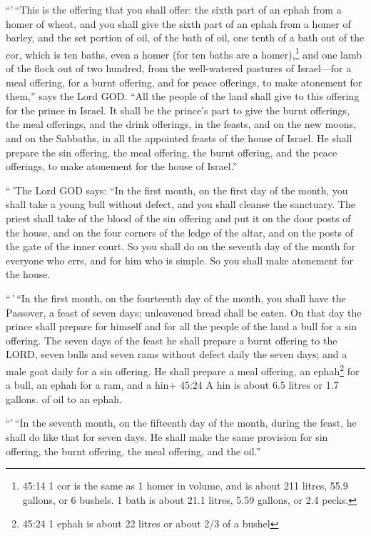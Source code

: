  ``'\,``This is the offering that you shall offer: the
sixth part of an ephah from a homer of wheat, and you shall give the
sixth part of an ephah from a homer of barley,  and the set
portion of oil, of the bath of oil, one tenth of a bath out of the cor,
which is ten baths, even a homer (for ten baths are a homer),\footnote{45:14
  1 cor is the same as 1 homer in volume, and is about 211 litres, 55.9
  gallons, or 6 bushels. 1 bath is about 21.1 litres, 5.59 gallons, or
  2.4 pecks.}  and one lamb of the flock out of two
hundred, from the well-watered pastures of Israel---for a meal offering,
for a burnt offering, and for peace offerings, to make atonement for
them,'' says the Lord GOD.  ``All the people of the land
shall give to this offering for the prince in Israel.  It
shall be the prince's part to give the burnt offerings, the meal
offerings, and the drink offerings, in the feasts, and on the new moons,
and on the Sabbaths, in all the appointed feasts of the house of Israel.
He shall prepare the sin offering, the meal offering, the burnt
offering, and the peace offerings, to make atonement for the house of
Israel.''

 ``\,'The Lord GOD says: ``In the first month, on the first
day of the month, you shall take a young bull without defect, and you
shall cleanse the sanctuary.  The priest shall take of the
blood of the sin offering and put it on the door posts of the house, and
on the four corners of the ledge of the altar, and on the posts of the
gate of the inner court.  So you shall do on the seventh
day of the month for everyone who errs, and for him who is simple. So
you shall make atonement for the house.

 ``\,'\,``In the first month, on the fourteenth day of the
month, you shall have the Passover, a feast of seven days; unleavened
bread shall be eaten.  On that day the prince shall prepare
for himself and for all the people of the land a bull for a sin
offering.  The seven days of the feast he shall prepare a
burnt offering to the LORD, seven bulls and seven rams without defect
daily the seven days; and a male goat daily for a sin offering.
 He shall prepare a meal offering, an ephah\footnote{45:24
  1 ephah is about 22 litres or about 2/3 of a bushel} for a bull, an
ephah for a ram, and a hin+ 45:24 A hin is about 6.5 litres or 1.7
gallons. of oil to an ephah.

 ``'\,``In the seventh month, on the fifteenth day of the
month, during the feast, he shall do like that for seven days. He shall
make the same provision for sin offering, the burnt offering, the meal
offering, and the oil.''


